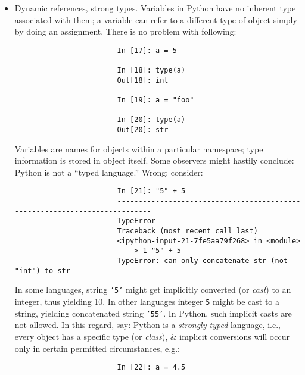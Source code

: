 \documentclass{article}
\newtheorem{remark}{Remark}
\begin{document}
\begin{enumerate}
\begin{itemize}
\begin{itemize}
\begin{itemize}
\begin{itemize}
					\begin{remark}
						Assignment is also referred to as {\rm binding}, as we are binding a name to an object. Variable names that have been assigned may occasionally be referred to as bound variables.
					\end{remark}
					When pass objects as arguments to a function, new local variables are created referencing original objects without any copying. If bind a new object to a variable inside a function, that will not overwrite a variable of same name in ``scope'' outside of function (``parent scope''). Therefore possible to alter internals of a mutable argument. Suppose had following function:
					\begin{verbatim}
						In [13]: def append_element(some_list, element):
						   ....:     some_list.append(element)
					\end{verbatim}
					Then have:
					\begin{verbatim}
						In [14]: data = [1, 2, 3]
						
						In [15]: append_element(data, 4)
						
						In [16]: data
						Out[16]: [1, 2, 3, 4]
					\end{verbatim}
					\item {\sf Dynamic references, strong types.} Variables in Python have no inherent type associated with them; a variable can refer to a different type of object simply by doing an assignment. There is no problem with following:
					\begin{verbatim}
						In [17]: a = 5
						
						In [18]: type(a)
						Out[18]: int
						
						In [19]: a = "foo"
						
						In [20]: type(a)
						Out[20]: str
					\end{verbatim}
					Variables are names for objects within a particular namespace; type information is stored in object itself. Some observers might hastily conclude: Python is not a ``typed language.'' Wrong: consider:
					\begin{verbatim}
						In [21]: "5" + 5
						---------------------------------------------------------------------------
						TypeError
						Traceback (most recent call last)
						<ipython-input-21-7fe5aa79f268> in <module>
						----> 1 "5" + 5
						TypeError: can only concatenate str (not "int") to str
					\end{verbatim}
					In some languages, string {\tt'5'} might get implicitly converted (or {\it cast}) to an integer, thus yielding 10. In other languages integer {\tt5} might be cast to a string, yielding concatenated string {\tt'55'}. In Python, such implicit casts are not allowed. In this regard, say: Python is a {\it strongly typed} language, i.e., every object has a specific type (or {\it class}), \& implicit conversions will occur only in certain permitted circumstances, e.g.:
					\begin{verbatim}
						In [22]: a = 4.5
						

\end{verbatim}
\end{itemize}
\end{itemize}
\end{itemize}
\end{itemize}
\end{enumerate}
\end{document}
